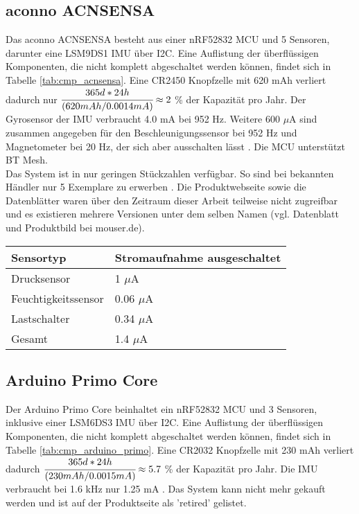 \subsection{aconno ACNSENSA}
Das aconno ACNSENSA besteht aus einer nRF52832 MCU und 5 Sensoren, darunter eine LSM9DS1 IMU über I2C.
Eine Auflistung der überflüssigen Komponenten, die nicht komplett abgeschaltet werden können, findet sich in Tabelle \ref{tab:cmp_acnsensa}.
Eine CR2450 Knopfzelle mit 620 mAh verliert dadurch nur $\cfrac{365d*24h}{(620mAh/0.0014mA)} \approx 2$ \% der Kapazität pro Jahr.
Der Gyrosensor der IMU verbraucht 4.0 mA bei 952 Hz.
Weitere 600 $\mu$A sind zusammen angegeben für den Beschleunigungssensor bei 952 Hz und Magnetometer bei 20 Hz, der sich aber ausschalten lässt \cite{datasheet_lsm9ds1}.
Die MCU unterstützt BT Mesh. \cite{datasheet_acnsensa}\\
Das System ist in nur geringen Stückzahlen verfügbar.
So sind bei bekannten Händler nur 5 Exemplare zu erwerben \cite{site_mouserAcnsensa}.
Die Produktwebseite sowie die Datenblätter waren über den Zeitraum dieser Arbeit teilweise nicht zugreifbar und es existieren mehrere Versionen unter dem selben Namen (vgl. Datenblatt und Produktbild bei mouser.de).

\begin{minipage}{\linewidth}
	\label{tab:cmp_acnsensa}
	\begin{tabularx}{\linewidth}{X|X}
		Sensortyp & Stromaufnahme ausgeschaltet\\
		\hline
    Drucksensor & 1 $\mu$A \cite{datasheet_acnsensa}\\
    Feuchtigkeitssensor & 0.06 $\mu$A \cite{datasheet_acnsensa}\\
    Lastschalter & 0.34 $\mu$A \cite{datasheet_sip32401a}\\
    \hline
    Gesamt & 1.4 $\mu$A\\
  \end{tabularx}
\end{minipage}

\subsection{Arduino Primo Core}
Der Arduino Primo Core beinhaltet ein nRF52832 MCU und 3 Sensoren, inklusive einer LSM6DS3 IMU über I2C.
Eine Auflistung der überflüssigen Komponenten, die nicht komplett abgeschaltet werden können, findet sich in Tabelle \ref{tab:cmp_arduino_primo}.
Eine CR2032 Knopfzelle mit 230 mAh verliert dadurch $\cfrac{365d*24h}{(230mAh/0.0015mA)} \approx 5.7$ \% der Kapazität pro Jahr.
Die IMU verbraucht bei 1.6 kHz nur 1.25 mA \cite{datasheet_lsm6ds3}.
Das System kann nicht mehr gekauft werden und ist auf der Produktseite als 'retired' gelistet.\cite{site_primo} \cite{datasheet_primo}

